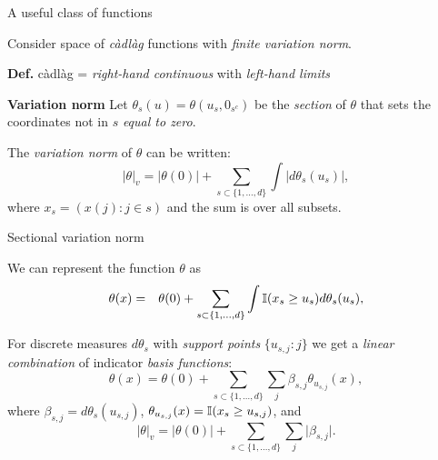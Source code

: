 \documentclass{beamer}
\begin{document}
\begin{frame}{A useful class of functions}
\vspace{0.75cm}

Consider space of \textit{c\`adl\`ag} functions with \textit{finite variation
norm}.

\textbf{Def.} c\`adl\`ag = \textit{right-hand continuous} with
\textit{left-hand limits}
\vspace{0.25cm}

\textbf{Variation norm}
Let $\theta_s(u)=\theta(u_s,0_{s^c})$ be the \textit{section} of $\theta$ that
sets the coordinates not in $s$ \textit{equal to zero}.
\vspace{0.15cm}

The \textit{variation norm} of $\theta$ can be written:
\[
  \lvert \theta \rvert_v = \lvert \theta(0) \rvert +
  \sum_{s\subset\{1,\dots,d\}}\int \lvert d\theta_s(u_s) \rvert ,
\]
where $x_s=(x(j):j\in s)$ and the sum is over all subsets.

\note{
}

\end{frame}


\begin{frame}{Sectional variation norm}

We can represent the function $\theta$ as
\begin{eqnarray*}
\theta(x)&=&\theta(0) + \sum_{s\subset\{1,\ldots,d\}}
  \int \mathbb{I}(x_s\geq u_s)d\theta_s(u_s),
\end{eqnarray*}

For discrete measures $d\theta_s$ with \textit{support points} $\{u_{s,j}:j\}$
we get a \textit{linear combination} of indicator \textit{basis functions}:
\[
  \theta(x) = \theta(0) + \sum_{s\subset\{1,\ldots,d\}}\sum_{j} \beta_{s,j}
    \theta_{u_{s,j}}(x),
\]
where $\beta_{s,j}=d\theta_s(u_{s,j})$,
$\theta_{u_{s,j}}(x) = \mathbb{I}(x_s \ge u_{s,j})$,
and
\begin{equation*}
\lvert \theta \rvert_v = \lvert \theta(0) \rvert + \sum_{s\subset\{1,\ldots,d\}}
  \sum_j \lvert \beta_{s,j} \rvert.
\end{equation*}

\note{
}

\end{frame}

\end{document}
